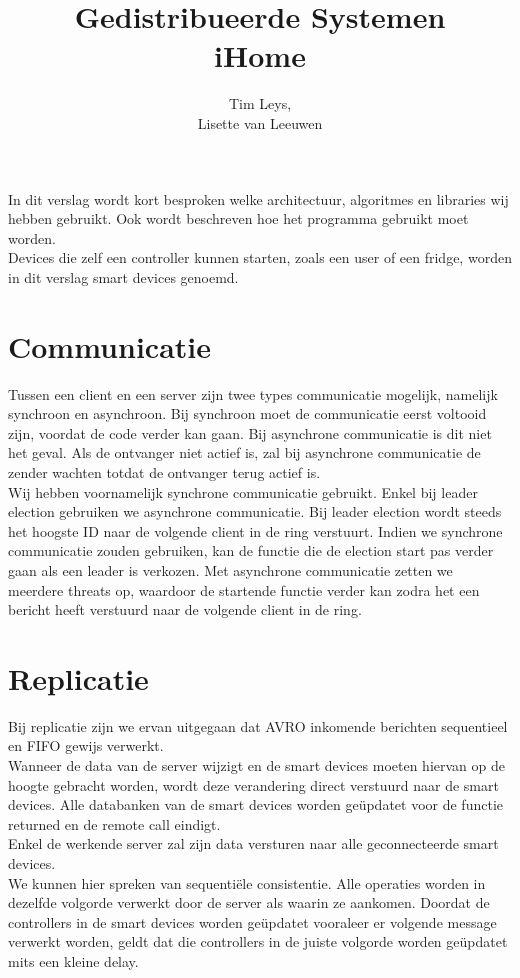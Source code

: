 \documentclass[a4paper]{article}
\title{ %
	Gedistribueerde Systemen \\
	\large iHome
	}
\author{ %
	Tim Leys, \\
	Lisette van Leeuwen \\
	}
\begin{document}
	\maketitle
	
	In dit verslag wordt kort besproken welke architectuur, algoritmes en libraries wij hebben gebruikt. Ook wordt beschreven hoe het programma gebruikt moet worden. \\
	Devices die zelf een controller kunnen starten, zoals een user of een fridge, worden in dit verslag smart devices genoemd. 
	
	\section{Communicatie}
		Tussen een client en een server zijn twee types communicatie mogelijk, namelijk synchroon en asynchroon. Bij synchroon moet de communicatie eerst voltooid zijn, voordat de code verder kan gaan. Bij asynchrone communicatie is dit niet het geval. Als de ontvanger niet actief is, zal bij asynchrone communicatie de zender wachten totdat de ontvanger terug actief is. \\
		Wij hebben voornamelijk synchrone communicatie gebruikt. Enkel bij leader election gebruiken we asynchrone communicatie. Bij leader election wordt steeds het hoogste ID naar de volgende client in de ring verstuurt. Indien we synchrone communicatie zouden gebruiken, kan de functie die de election start pas verder gaan als een leader is verkozen. Met asynchrone communicatie zetten we meerdere threats op, waardoor de startende functie verder kan zodra het een bericht heeft verstuurd naar de volgende client in de ring. 
		
	\section{Replicatie}
		Bij replicatie zijn we ervan uitgegaan dat AVRO inkomende berichten sequentieel en FIFO gewijs verwerkt. \\
		Wanneer de data van de server wijzigt en de smart devices moeten hiervan op de hoogte gebracht worden, wordt deze verandering direct verstuurd naar de smart devices. Alle databanken van de smart devices worden ge\"updatet voor de functie returned en de remote call eindigt. \\
		Enkel de werkende server zal zijn data versturen naar alle geconnecteerde smart devices. \\
		We kunnen hier spreken van sequenti\"ele consistentie. Alle operaties worden in dezelfde volgorde verwerkt door de server als waarin ze aankomen. Doordat de controllers in de smart devices worden ge\"updatet vooraleer er volgende message verwerkt worden, geldt dat die controllers in de juiste volgorde worden ge\"updatet mits een kleine delay.	
	
\end{document}

